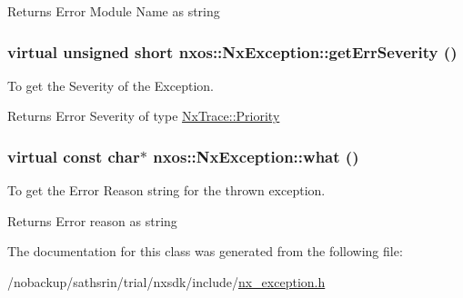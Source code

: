 \begin{DoxyReturn}{Returns}
Error Module Name as string 
\end{DoxyReturn}
\hypertarget{classnxos_1_1NxException_a7b5ffd11c04e3955d874ea7a6b18063f}{
\subsubsection[{getErrSeverity}]{\setlength{\rightskip}{0pt plus 5cm}virtual unsigned short nxos::NxException::getErrSeverity ()}}
\label{classnxos_1_1NxException_a7b5ffd11c04e3955d874ea7a6b18063f}
To get the Severity of the Exception.

\begin{DoxyReturn}{Returns}
Error Severity of type \hyperlink{classnxos_1_1NxTrace_a582f6e5a22e788c61807657f8bca088f}{NxTrace::Priority} 
\end{DoxyReturn}
\hypertarget{classnxos_1_1NxException_ad475b90fb193848245b9537524439943}{
\subsubsection[{what}]{\setlength{\rightskip}{0pt plus 5cm}virtual const char$\ast$ nxos::NxException::what ()}}
\label{classnxos_1_1NxException_ad475b90fb193848245b9537524439943}
To get the Error Reason string for the thrown exception.

\begin{DoxyReturn}{Returns}
Error reason as string 
\end{DoxyReturn}


The documentation for this class was generated from the following file:\begin{DoxyCompactItemize}
\item 
/nobackup/sathsrin/trial/nxsdk/include/\hyperlink{nx__exception_8h}{nx\_\-exception.h}\end{DoxyCompactItemize}
